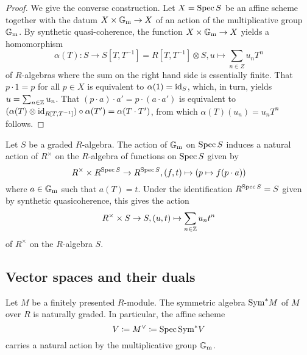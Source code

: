 \begin{proof}
  We give the converse construction.  Let $X = \operatorname{Spec} S$ be an affine
  scheme together with the datum $X \times \mathbb{G}_\mathrm{m} \to X$ of an action of
  the multiplicative group $\mathbb{G}_\mathrm{m}$.  By synthetic quasi-coherence, the
  function $X \times \mathbb{G}_\mathrm{m} \to X$ yields a homomorphism
  \begin{equation*}
    \alpha(T)\colon S \to S[T, T^{-1}] = R[T, T^{-1}] \otimes S, u \mapsto \sum_{n \in Z} u_n T^n
  \end{equation*}
  of $R$-algebras where the sum on the right hand side is essentially
  finite.  That $p \cdot 1 = p$ for all $p \in X$ is equivalent to
  $\alpha(1) = \mathrm{id}_S$, which, in turn, yields
  $u = \sum_{n \in \mathbb{Z}} u_n$.  That $(p \cdot a) \cdot a' = p \cdot (a \cdot a')$ is equivalent to
  $(\alpha(T) \otimes \mathrm{id}_{R[T, T^{-1}]}) \circ \alpha(T') = \alpha(T \cdot T')$, from which $\alpha(T) (u_n) = u_n T^n$ follows.
\end{proof}

\begin{remark}
  Let $S$ be a graded $R$-algebra.  The action of $\mathbb{G}_\mathrm{m}$ on $\operatorname{Spec} S$ induces a natural action of $R^\times$ on the $R$-algebra of functions
  on $\operatorname{Spec} S$ given by
  \begin{equation*}
    R^\times \times R^{\operatorname{Spec} S} \to R^{\operatorname{Spec} S}, (f, t) \mapsto (p \mapsto f(p \cdot a))
  \end{equation*}
  where $a \in \mathbb{G}_\mathrm{m}$ such that $a(T) = t$.
  Under the identification $R^{\operatorname{Spec} S} = S$ given by synthetic quasicoherence, this gives the action
  \begin{equation*}
    R^\times \times S \to S, (u, t) \mapsto \sum_{n \in \mathbb{Z}} u_n t^n
  \end{equation*}
  of $R^\times$ on the $R$-algebra $S$.
\end{remark}

\subsection{Vector spaces and their duals}

\begin{example}
  Let $M$ be a finitely presented $R$-module.  The symmetric algebra
  $\mathrm{Sym}^* M$ of $M$ over $R$ is naturally graded.  In particular, the
  affine scheme
  \begin{equation*}
    V \coloneqq M\spcheck \coloneqq \Spec \Sym^* V
  \end{equation*}
  carries a natural action by the multiplicative group $\mathbb{G}_\mathrm{m}$.
\end{example}


